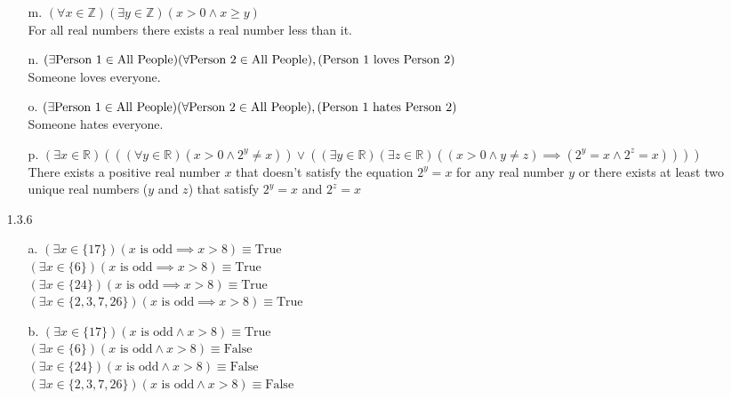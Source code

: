 \documentclass[11pt]{amsart}
\theoremstyle{definition}
\begin{document}
\begin{itemize}
\begin{itemize}
    \item[m.] $(\forall x\in\mathbb{Z})(\exists y\in\mathbb{Z})(x>0 \land x\ge y)$ \\
        For all real numbers there exists a real number less than it.

    \item[n.] $(\exists\text{Person 1}\in\text{All People})(\forall\text{Person 2}\in\text{All People}),\\(\text{Person 1 loves Person 2})$ \\
        Someone loves everyone.

    \item[o.] $(\exists\text{Person 1}\in\text{All People})(\forall\text{Person 2}\in\text{All People}),\\(\text{Person 1 hates Person 2})$ \\
        Someone hates everyone.

    \item[p.] $(\exists x\in\mathbb{R})(((\forall y\in\mathbb{R})(x>0\land2^y\ne x)) \lor
               ((\exists y\in\mathbb{R})(\exists z\in\mathbb{R})((x>0 \land y\ne z)\implies(2^y=x \land 2^z=x))))$ \\
        There exists a positive real number $x$ that doesn't satisfy the equation $2^y=x$ for any real number $y$ or there exists at least two unique real numbers ($y$ and $z$) that satisfy $2^y=x$ and $2^z=x$

\end{itemize}

\item[1.3.6]
\begin{itemize}
    \item[a.] $(\exists x\in\{17\})(x\text{ is odd}\implies x>8)\equiv\text{True}$ \\
    $(\exists x\in\{6\})(x\text{ is odd}\implies x>8)\equiv\text{True}$ \\
    $(\exists x\in\{24\})(x\text{ is odd}\implies x>8)\equiv\text{True}$ \\
    $(\exists x\in\{2,3,7,26\})(x\text{ is odd}\implies x>8)\equiv\text{True}$

    \item[b.] $(\exists x\in\{17\})(x\text{ is odd}\land x>8)\equiv\text{True}$ \\ 
    $(\exists x\in\{6\})(x\text{ is odd}\land x>8)\equiv\text{False}$ \\ 
    $(\exists x\in\{24\})(x\text{ is odd}\land x>8)\equiv\text{False}$ \\ 
    $(\exists x\in\{2,3,7,26\})(x\text{ is odd}\land x>8)\equiv\text{False}$


\end{itemize}
\end{itemize}
\end{document}
